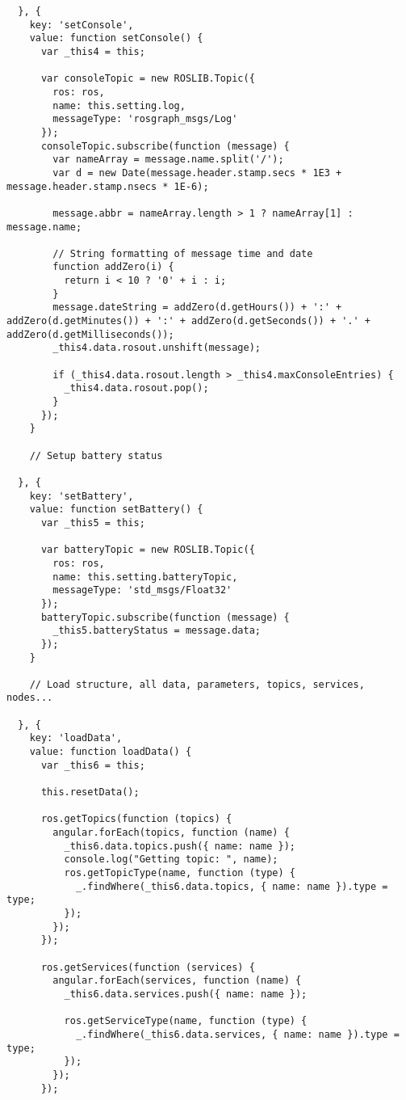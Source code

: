 \begin{verbatim}
  }, {
    key: 'setConsole',
    value: function setConsole() {
      var _this4 = this;

      var consoleTopic = new ROSLIB.Topic({
        ros: ros,
        name: this.setting.log,
        messageType: 'rosgraph_msgs/Log'
      });
      consoleTopic.subscribe(function (message) {
        var nameArray = message.name.split('/');
        var d = new Date(message.header.stamp.secs * 1E3 + message.header.stamp.nsecs * 1E-6);

        message.abbr = nameArray.length > 1 ? nameArray[1] : message.name;

        // String formatting of message time and date
        function addZero(i) {
          return i < 10 ? '0' + i : i;
        }
        message.dateString = addZero(d.getHours()) + ':' + addZero(d.getMinutes()) + ':' + addZero(d.getSeconds()) + '.' + addZero(d.getMilliseconds());
        _this4.data.rosout.unshift(message);

        if (_this4.data.rosout.length > _this4.maxConsoleEntries) {
          _this4.data.rosout.pop();
        }
      });
    }

    // Setup battery status

  }, {
    key: 'setBattery',
    value: function setBattery() {
      var _this5 = this;

      var batteryTopic = new ROSLIB.Topic({
        ros: ros,
        name: this.setting.batteryTopic,
        messageType: 'std_msgs/Float32'
      });
      batteryTopic.subscribe(function (message) {
        _this5.batteryStatus = message.data;
      });
    }

    // Load structure, all data, parameters, topics, services, nodes...

  }, {
    key: 'loadData',
    value: function loadData() {
      var _this6 = this;

      this.resetData();

      ros.getTopics(function (topics) {
        angular.forEach(topics, function (name) {
          _this6.data.topics.push({ name: name });
          console.log("Getting topic: ", name);
          ros.getTopicType(name, function (type) {
            _.findWhere(_this6.data.topics, { name: name }).type = type;
          });
        });
      });

      ros.getServices(function (services) {
        angular.forEach(services, function (name) {
          _this6.data.services.push({ name: name });

          ros.getServiceType(name, function (type) {
            _.findWhere(_this6.data.services, { name: name }).type = type;
          });
        });
      });


\end{verbatim}
